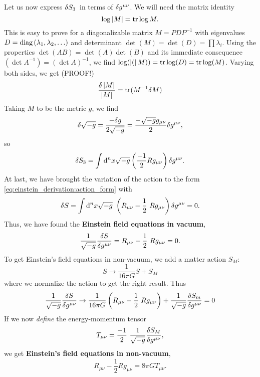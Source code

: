 Let us now express $\delta S_3$ in terms of $\delta g^{\mu \nu}$.
We will need the matrix identity
\begin{equation}
	\log{\left\lvert M \right\rvert} = \text{tr} \log{M} .
\end{equation}
This is easy to prove for a diagonalizable matrix $M = P D P^{-1}$ with eigenvalues $D = \text{diag} \left( \lambda_1, \lambda_2, \ldots \right)$ and determinant $\det(M) = \det(D) = \prod \lambda_i$.
Using the properties $\det(AB) = \det(A) \det(B)$ and its immediate consequence $(\det{A^{-1}}) = (\det{A})^{-1}$, we find $\log(\left\lvert ( \right\rvert M)) = \text{tr} \log(D) = \text{tr} \log(M)$.
Varying both sides, we get (PROOF!)
\begin{equation}
	\frac{\delta \left\lvert M \right\rvert}{\left\lvert M \right\rvert} = \text{tr} (M^{-1} \delta M)
\end{equation}
Taking $M$ to be the metric $g$, we find
\begin{equation}
	\delta \sqrt{-g} = \frac{-\delta g}{2 \sqrt{-g}} = \frac{- \sqrt{-g} g_{\mu \nu}}{2} \delta g^{\mu \nu},
\end{equation}
so
\begin{equation}
	\delta S_3 = \int \mathop{}\!\mathrm{d}^n x \sqrt{-g} \left( \frac{-1}{2} R g_{\mu \nu} \right) \delta g^{\mu \nu} .
\end{equation}
At last, we have brought the variation of the action to the form \cref{eq:einstein_derivation:action_form} with
\begin{equation}
	\variation{S} = \int \dif^n x \sqrt{-g} \left( R_{\mu \nu} - \frac{1}{2} R g_{\mu \nu} \right) \variation{g^{\mu \nu}} = 0 .
\end{equation}
Thus, we have found the \textbf{Einstein field equations in vacuum},
\begin{equation}
	 \frac{1}{\sqrt{-g}} \diffv{S}{g^{\mu \nu}} = R_{\mu \nu} - \frac{1}{2} R g_{\mu \nu} = 0 .
\end{equation}
To get Einstein's field equations in non-vacuum, we add a matter action $S_M$:
\begin{equation}
	S \rightarrow \frac{1}{16 \pi G} S + S_M
\end{equation}
where we normalize the action to get the right result.
Thus
\begin{equation}
	\frac{1}{\sqrt{-g}} \diffv{S}{g^{\mu \nu}} \rightarrow \frac{1}{16 \pi G} \left( R_{\mu \nu} - \frac{1}{2} R g_{\mu \nu} \right) + \frac{1}{\sqrt{-g}} \frac{\variation{S_m}}{\variation{g^{\mu \nu}}} = 0
\end{equation}
If we now \emph{define} the energy-momentum tensor
\begin{equation}
	T_{\mu \nu} = \frac{-1}{2} \frac{1}{\sqrt{-g}} \frac{\variation{S_M}}{\variation{g^{\mu \nu}}} ,
\end{equation}
we get \textbf{Einstein's field equations in non-vacuum},
\begin{equation}
	R_{\mu \nu} - \frac{1}{2} R g_{\mu \nu} = 8 \pi G T_{\mu \nu} .
\end{equation}

